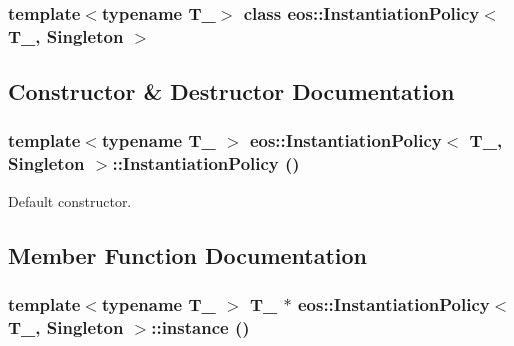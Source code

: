 \subsubsection*{template$<$typename T\_\-$>$ class eos::InstantiationPolicy$<$ T\_\-, Singleton $>$}



\subsection{Constructor \& Destructor Documentation}
\hypertarget{classeos_1_1InstantiationPolicy_3_01T___00_01Singleton_01_4_a18668ba37f53fb8e90de2ad25a8f9873}{
\subsubsection[{InstantiationPolicy}]{\setlength{\rightskip}{0pt plus 5cm}template$<$typename T\_\- $>$ eos::InstantiationPolicy$<$ T\_\-, Singleton $>$::InstantiationPolicy ()}}
\label{classeos_1_1InstantiationPolicy_3_01T___00_01Singleton_01_4_a18668ba37f53fb8e90de2ad25a8f9873}


Default constructor. 

\subsection{Member Function Documentation}
\hypertarget{classeos_1_1InstantiationPolicy_3_01T___00_01Singleton_01_4_ab911bf9d8849e3af50a8fa886d0d5b70}{
\subsubsection[{instance}]{\setlength{\rightskip}{0pt plus 5cm}template$<$typename T\_\- $>$ T\_\- $\ast$ eos::InstantiationPolicy$<$ T\_\-, Singleton $>$::instance ()}}
\label{classeos_1_1InstantiationPolicy_3_01T___00_01Singleton_01_4_ab911bf9d8849e3af50a8fa886d0d5b70}


